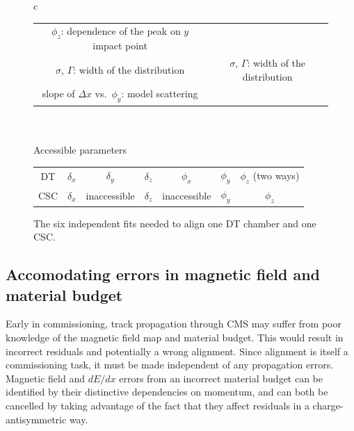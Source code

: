\documentclass[12pt]{article}
\begin{document}
\begin{figure}
\begin{center}
\begin{tabular}{c}
\begin{tabular}{| c | c |}
$\phi_z$: dependence of the peak on $y$ impact point & \\
$\sigma$, $\Gamma$: width of the distribution & $\sigma$, $\Gamma$: width of the distribution \\
slope of $\Delta x$ vs.~$\phi_y$: model scattering & \\\hline
\end{tabular} \\
\\
Accessible parameters \\
\begin{tabular}{c | c c c c c c}
\hline DT & \hspace{0.6 cm}$\delta_x$\hspace{0.6 cm} & $\delta_y$ & $\delta_z$ & $\phi_x$ & \hspace{0.6 cm}$\phi_y$\hspace{0.6 cm} & $\phi_z$ (two ways) \\
CSC & $\delta_x$ & inaccessible & $\delta_z$ & inaccessible & $\phi_y$ & $\phi_z$ \\
\end{tabular}
\end{tabular}

\end{center}
\caption{The six independent fits needed to align one DT chamber and one CSC. \label{tab:parameters}}
\end{figure}

\subsection{Accomodating errors in magnetic field and material budget}
\label{sec:bfield_errors}

Early in commissioning, track propagation through CMS may suffer from
poor knowledge of the magnetic field map and material budget.  This
would result in incorrect residuals and potentially a wrong alignment.
Since alignment is itself a commissioning task, it must be made
independent of any propagation errors.  Magnetic field and $dE/dx$
errors from an incorrect material budget can be identified by their
distinctive dependencies on momentum, and can both be cancelled by
taking advantage of the fact that they affect residuals in a
charge-antisymmetric way.
\end{document}
